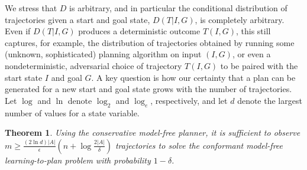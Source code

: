 \documentclass[letterpaper]{article}
\newenvironment{proof}{\noindent{\bf Proof:~~}}{\qed}
\newcommand{\qed}{\hfill\ensuremath{\blacksquare}}
\newtheorem{theorem}{Theorem}
\newcommand{\MEMO}[1]
{ \fbox{
\begin{minipage}[b]{7.9 cm}
#1
\end{minipage}
} }
\begin{document}
We stress that $D$ is arbitrary, and in particular the conditional distribution
of trajectories given a start and goal state, $D(T|I,G)$, is completely 
arbitrary. Even if $D(T|I,G)$ produces a deterministic outcome $T(I,G)$, this
still captures, for example, the distribution of trajectories obtained
by running some (unknown, sophisticated) planning algorithm on input $(I,G)$, or
even a nondeterministic, adversarial choice of trajectory $T(I,G)$ to 
be paired with the start state $I$ and goal $G$. 
A key question is how our certainty that a plan can be generated for a new start and goal state grows with the number of trajectories. Let $\log$ and $\ln$ denote $\log_2$ and $\log_e$, respectively, and let $d$ denote the largest number of values
for a state variable. 
\begin{theorem}
Using the conservative model-free planner, 
it is sufficient to observe 
$m\geq\frac{(2\ln  d)|A|}{\epsilon}(n+\log\frac{2|A|}{\delta})$
 trajectories to solve the conformant model-free learning-to-plan problem with probability $1-\delta$. 
\label{the:pac-conformant}
\end{theorem}
\end{document}
